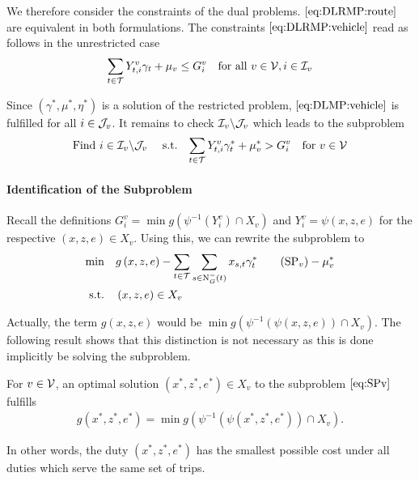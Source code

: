 We therefore consider the constraints of the dual problems. $\eqref{eq:DLRMP:route}$ are equivalent in both formulations. The constraints $\eqref{eq:DLRMP:vehicle}$ read as follows in the unrestricted case
\begin{align}
	\sum_{t\in\mathcal{T}} Y^v_{t,i}\gamma_t + \mu_v \leq G^v_i && \text{for all } v\in\mathcal{V},i\in\mathcal{I}_v \label{eq:DLMP:vehicle}
\end{align}

Since $\left(\gamma^*,\mu^*,\eta^*\right)$ is a solution of the restricted problem, $\eqref{eq:DLMP:vehicle}$ is fulfilled for all $i\in\mathcal{J}_v$. It remains to check $\mathcal{I}_v\backslash\mathcal{J}_v$ which leads to the subproblem
\begin{align}
	\text{Find } i\in\mathcal{I}_v\backslash\mathcal{J}_v && \text{ s.t.} && \sum_{t\in\mathcal{T}}Y^v_{t,i}\gamma^*_t + \mu^*_v > G^v_i && \text{for } v\in\mathcal{V}
\end{align}

\paragraph{Identification of the Subproblem} \parfill

Recall the definitions ${G^v_i = \min g\left(\psi^{-1}\left(Y^v_i\right)\cap X_v\right)}$ and ${Y^v_i = \psi(x,z,e)}$ for the respective ${(x,z,e)\in X_v}$. Using this, we can rewrite the subproblem to
\begin{align*}
	\min \quad & g\left(x,z,e\right)-\sum_{t\in\mathcal{T}}\sum_{s\in\Nin(t)}x_{s,t}\gamma^*_t \tag{$\operatorname{SP}_v$} - \mu^*_v \label{eq:SPv} \\
	\text{s.t.} \quad & \left(x,z,e\right)\in X_v
\end{align*}

Actually, the term $g(x,z,e)$ would be ${\min g\left(\psi^{-1}\left(\psi(x,z,e)\right)\cap X_v\right)}$. The following result shows that this distinction is not necessary as this is done implicitly be solving the subproblem.

\begin{lemma}

For $v\in\mathcal{V}$, an optimal solution ${\left(x^*,z^*,e^*\right)\in X_v}$ to the subproblem $\eqref{eq:SPv}$ fulfills
\begin{align*}
	g\left(x^*,z^*,e^*\right) = \min g\left(\psi^{-1}\left(\psi\left(x^*,z^*,e^*\right)\right)\cap X_v\right).
\end{align*}

In other words, the duty $\left(x^*,z^*,e^*\right)$ has the smallest possible cost under all duties which serve the same set of trips.

\end{lemma}

